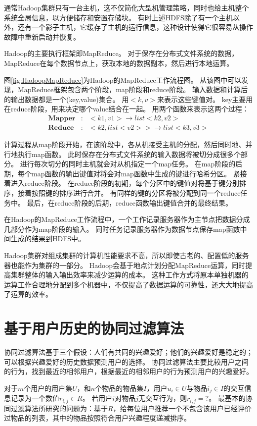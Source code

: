 通常Hadoop集群只有一台主机，这不仅简化大型机管理策略，同时也给主机整个系统全局信息，以方便储存和安置存储块。
有时上述HDFS除了有一个主机以外，还有一个影子主机，它缓存了主机的运行信息，这种设计使得它很容易从操作故障中重新启动并恢复。

Hadoop的主要执行框架即MapReduce。
对于保存在分布式文件系统的数据，MapReduce在每个数据节点上，获取本地的数据副本，然后进行本地运算。

图\ref{fig:HadoopMapReduce}为Hadoop的MapReduce工作流程图。
从该图中可以发现，MapReduce框架包含两个阶段，map阶段和reduce阶段。
输入数据和计算后的输出数据都是一个(key,value)集合。
用$<k,v>$来表示这些键值对。
key主要用在reduce阶段，用来决定哪个value结合在一起。
用两个函数来表示这两个过程：
\begin{eqnarray}
\mathbf{Mapper} &:& <k1,v1> \rightarrow list<k2,v2> \\
\mathbf{Reduce} &:& <k2,list<v2>> \rightarrow list<k3,v3>
\end{eqnarray}

计算过程从map阶段开始，在该阶段中，各从机接受主机的分配，然后同时地、并行地执行map函数。
此时保存在分布式文件系统的输入数据将被切分成很多个部分。
进行每次切分的同时主机就会对从机指定一个map任务。
在map阶段的后期，每个map函数的输出键值对将会对map函数中生成的键进行哈希分区。
紧接着进入reduce阶段。
在reduce阶段的初期，每个分区中的键值对将基于键分别排序，接着按照键的排序进行合并。
有同样的键的分区将被分配到同一个reduce任务中。
最后，在reduce阶段的后期，reduce函数输出键值合并的最终结果。

在Hadoop的MapReduce工作流程中，一个工作记录服务器作为主节点把数据分成几部分作为map阶段的输入。
同时任务记录服务器作为数据节点保存map函数中间生成的结果到HDFS中。

Hadoop集群对组成集群的计算机性能要求不高，所以即使古老的、配置低的服务器也能作为集群的一部分。
Hadoop会基于地点计划分配MapReduce运算，同时提高集群整体的输入输出效率来减少运算的成本。
这种工作方式将原本单独机器的运算工作合理地分配到多个机器中，不仅提高了数据运算的可靠性，还大大地提高了运算的效率。


\section{基于用户历史的协同过滤算法}
协同过滤算法基于三个假设：人们有共同的兴趣爱好；他们的兴趣爱好是稳定的；可以根据兴趣爱好的历史数据预测用户的选择。
协同过滤算法主要比较用户之间的行为，找到最近的相邻用户，根据最近的相邻用户的行为预测用户的兴趣爱好。

对于$m$个用户的用户集$U$，和$n$个物品的物品集$I$，用户$u_i \in U$与物品$i_j \in I$的交互信息记录为一个数值$r_{i,j} \in R$。
若用户$i$对物品$j$无交互行为，则$r_{i,j}=?$。
最基本的协同过滤算法所研究的问题为：基于$R$，给每位用户推荐一个不包含该用户已经评价过物品的列表，其中的物品按照符合用户兴趣程度递减排序。

